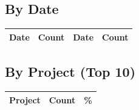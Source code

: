 \documentclass[10pt,a4paper]{article}
\begin{document}
\subsection*{By Date}

\begin{center}
\begin{tabular}{lr|lr}
\toprule
\textbf{Date} & \textbf{Count} & \textbf{Date} & \textbf{Count} \\
\midrule
\bottomrule
\end{tabular}
\end{center}

\subsection*{By Project (Top 10)}

\begin{center}
\begin{tabular}{lrr}
\toprule
\textbf{Project} & \textbf{Count} & \textbf{\%} \\
\midrule
\bottomrule
\end{tabular}
\end{center}

\newpage

\end{document}
